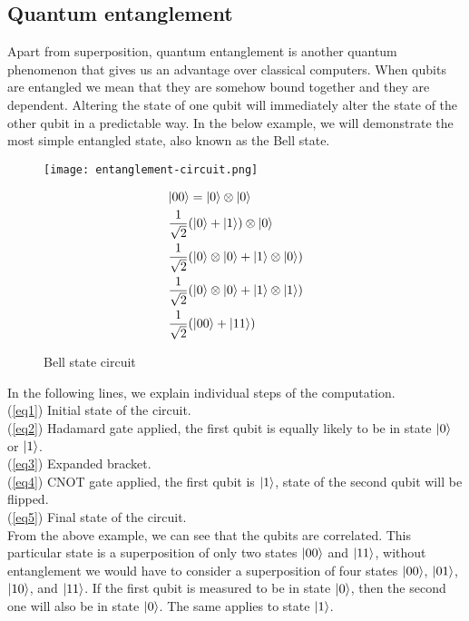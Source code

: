 \subsection{Quantum entanglement}
Apart from superposition, quantum entanglement is another quantum phenomenon that gives us an advantage over classical computers. When qubits are entangled we mean that they are somehow bound together and they are dependent. Altering the state of one qubit will immediately alter the state of the other qubit in a predictable way. In the below example, we will demonstrate the most simple entangled state, also known as the Bell state.

\begin{figure}[H]
\begin{minipage}{.35\textwidth}
    \texttt{[image: entanglement-circuit.png]}
    \caption{Bell state circuit}

\end{minipage}
\hfill
\begin{minipage}{.50\textwidth}
  \begin{align} 
             &\lvert00\rangle = \lvert0\rangle \otimes \lvert0\rangle \label{eq1} \\
             &\frac{1}{\sqrt{2}}(\lvert0\rangle + \lvert1\rangle) \otimes \lvert0\rangle \label{eq2}\\
             &\frac{1}{\sqrt{2}}(\lvert0\rangle \otimes \lvert0\rangle + \lvert1\rangle \otimes \lvert0\rangle) \label{eq3} \\
             &\frac{1}{\sqrt{2}}(\lvert0\rangle \otimes \lvert0\rangle + \lvert1\rangle \otimes \lvert1\rangle) \label{eq4}\\
             &\frac{1}{\sqrt{2}}(\lvert00\rangle + \lvert11\rangle) \label{eq5}
  \end{align}
\end{minipage}
\end{figure}

\noindent In the following lines, we explain individual steps of the computation.\\
\noindent (\ref{eq1}) Initial state of the circuit.\\
(\ref{eq2}) Hadamard gate applied, the first qubit is equally likely to be in state $\lvert0\rangle$ or $\lvert1\rangle$.\\
(\ref{eq3}) Expanded bracket.\\
(\ref{eq4}) CNOT gate applied, the first qubit is $\lvert1\rangle$, state of the second qubit will be flipped.\\
(\ref{eq5}) Final state of the circuit.\\

\noindent From the above example, we can see that the qubits are correlated. This particular state is a superposition of only two states $\lvert00\rangle$ and $\lvert11\rangle$, without entanglement we would have to consider a superposition of four states $\lvert00\rangle$, $\lvert01\rangle$, $\lvert10\rangle$, and $\lvert11\rangle$. If the first qubit is measured to be in state $\lvert0\rangle$, then the second one will also be in state $\lvert0\rangle$. The same applies to state $\lvert1\rangle$.

